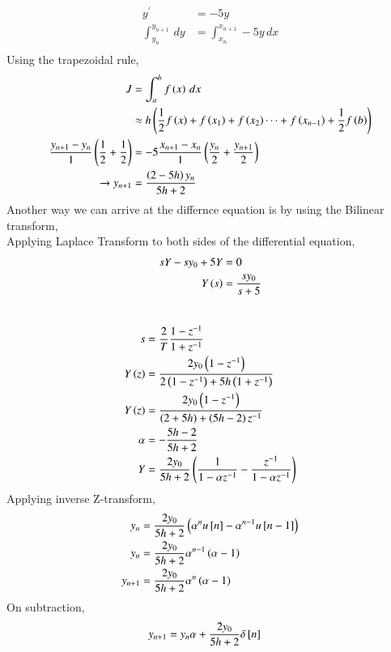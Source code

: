 \documentclass[journal]{IEEEtran}
\begin{document}
\begin{align}
    y^{\prime} &= -5y \\
    \int_{y_n}^{y_{n+1}} \, dy &= \int_{x_n}^{x_{n+1}} -5y \, dx\\
\end{align}
Using the trapezoidal rule,
\begin{align}
    J &= \int_a^b f\left(x\right)\, dx\\
    &\approx h\left(\frac{1}{2}f\left(x\right) + f\left(x_1\right) + f\left(x_2\right) \cdots + f\left(x_{n-1}\right) + \frac{1}{2}f\left(b\right)\right)\\
    \frac{y_{n+1} - y_n}{1}\left(\frac{1}{2} + \frac{1}{2}\right)
    &= -5\frac{x_{n+1} - x_{n}}{1}\left(\frac{y_n}{2} +\frac{y_{n+1}}{2}\right) \\ 
    \xrightarrow{} y_{n+1} &= \frac{\left(2-5h\right)y_n}{5h+2} 
\end{align}
Another way we can arrive at the differnce equation is by using the Bilinear transform,\\
Applying Laplace Transform to both sides of the differential equation,
\begin{align}
    sY - sy_0 + 5Y &= 0\\
    Y\left(s\right) &= \frac{sy_0}{s+5}\\
\end{align}
    \\
\begin{align}
    s &= \frac{2}{T} \frac{1-z^{-1}}{1+z^{-1}}\\
    Y\left(z\right) &= \frac{2y_0\left(1 - z^{-1}\right)}{2\left(1 - z^{-1}\right) + 5h\left(1 + z^{-1}\right)}\\
    Y\left(z\right) &= \frac{2y_0\left(1 - z^{-1}\right)}{\left(2+5h\right) + \left(5h-2\right)z^{-1}}\\
    \alpha &= -\frac{5h-2}{5h+2}\\
    Y &= \frac{2y_0}{5h+2}\left(\frac{1}{1- \alpha z^{-1}} - \frac{z^{-1}}{1 - \alpha z^{-1}}\right)
\end{align}
Applying inverse Z-transform,
\begin{align}
    y_n &= \frac{2y_0}{5h+2} \left(\alpha ^n u{}\left[n\right] - \alpha^{n-1}u{}\left[n-1\right]\right)\\  
    y_n &= \frac{2y_0}{5h+2}\alpha^{n-1}\left(\alpha - 1\right)\\
    y_{n+1} &= \frac{2y_0}{5h+2}\alpha^{n}\left(\alpha - 1\right)\\
\end{align}
On subtraction,
\begin{align}
    y_{n+1} &= y_n\alpha + \frac{2y_0}{5h+2}\delta {}\left[n\right]
\end{align}
\end{document}
